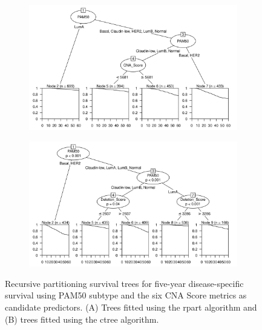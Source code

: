 \begin{figure}[!h]
\centering

\vspace{0.5cm}

\begin{subfigure}{\textwidth}
\subcaption{}
\includegraphics[width=1\textwidth]{../figures/Chapter_3/PartyKit_Survival_Score_FiveYearDSS_PAM50.png}
\end{subfigure}

\vspace{2cm}

\begin{subfigure}{\textwidth}
\subcaption{}
\includegraphics[width=1\textwidth]{../figures/Chapter_3/Ctree_Survival_Score_FiveYearDSS_PAM50.png}
\end{subfigure}

\vspace{0.5cm}

\caption[Recursive partitioning survival trees for five-year disease-specific survival using PAM50 subtype and the six CNA Score metrics as candidate predictors.]{Recursive partitioning survival trees for five-year disease-specific survival using PAM50 subtype and the six CNA Score metrics as candidate predictors. (A) Trees fitted using the rpart algorithm and (B) trees fitted using the ctree algorithm.}
\label{fig:PAM50_CNA_Score_FiveYearDSS}
\end{figure}

